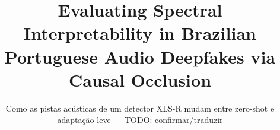 \documentclass[sigconf]{acmart}
\begin{document}
\title{Evaluating Spectral Interpretability in Brazilian Portuguese Audio
Deepfakes via Causal Occlusion}
\subtitle{Como as pistas acústicas de um detector XLS-R mudam entre zero-shot e
adaptação leve --- TODO: confirmar/traduzir}

\author{}

\renewcommand{\shortauthors}{João Victor et al.}
\end{document}
